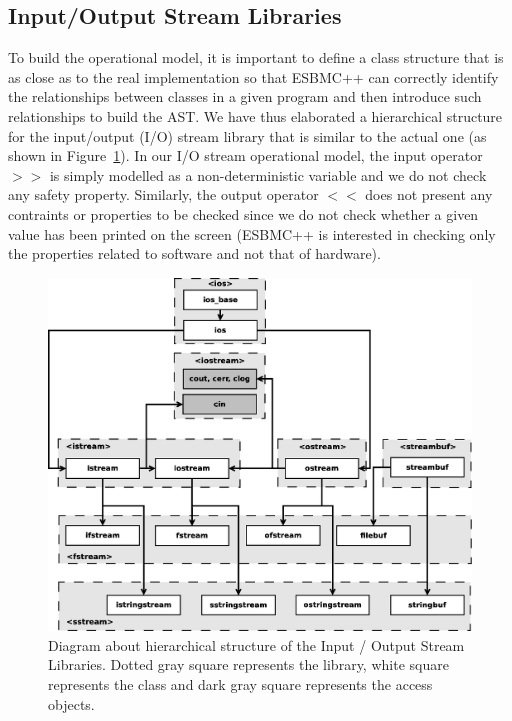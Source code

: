 \documentclass[a4paper]{llncs}
\begin{document}
\subsection{Input/Output Stream Libraries}

To build the operational model, it is important
to define a class structure that is as close as to the
real implementation so that ESBMC++ can correctly identify
the relationships between classes in a given program and
then introduce such relationships to build the AST.
We have thus elaborated a hierarchical structure for the
input/output (I/O) stream library that is similar to the actual
one (as shown in Figure~\ref{figure:cpp-inputoutputdiagram}).
In our I/O stream operational model, the input operator $>>$
is simply modelled as a non-deterministic variable and we do not check
any safety property. Similarly, the output operator $<<$ does not
present any contraints or properties to be checked since
we do not check whether a given value has been printed on the screen
(ESBMC++ is interested in checking only the properties related to
software and not that of hardware).


\begin{figure}[ht]
\centering
\includegraphics[scale=0.24]{figures/inputoutputdiagram}
\caption{Diagram about hierarchical structure of the Input / Output Stream Libraries.
Dotted gray square represents the library, white square represents the class and dark gray square represents the access objects.}
\label{figure:cpp-inputoutputdiagram}
\end{figure}
\end{document}

